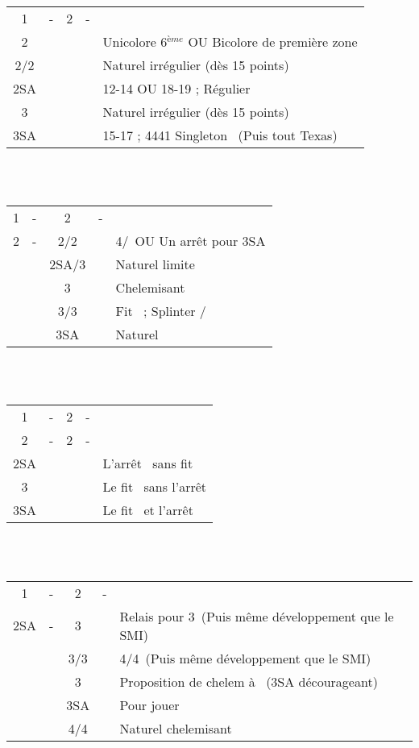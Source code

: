 \documentclass[a4paper, oneside, 11pt]{report}
\begin{document}
\newpage
		\begin{tabular}{cccc|l}
		1\carreau & - & 2\trefle & - &\\
		2\carreau &&&& Unicolore 6$^{ème}$ OU Bicolore de première zone\\
		2\coeur/2\pique &&&& Naturel irrégulier (dès 15 points) \\
		2SA &&&& 12-14 OU 18-19 ; Régulier\\
		3\trefle &&&& Naturel irrégulier (dès 15 points)\\
		3SA &&&& 15-17 ; 4441 Singleton \trefle\ (Puis tout Texas)\\
		\end{tabular}\\\\

		\begin{tabular}{cccc|l}
		1\carreau & - & 2\trefle & - &\\
		2\carreau & - & 2\coeur/2\pique && 4\coeur/\pique\ OU Un arrêt pour 3SA\\
		&& 2SA/3\trefle && Naturel limite\\
		&& 3\carreau && Chelemisant \carreau\\
		&& 3\coeur/3\pique && Fit \carreau\ ; Splinter \coeur/\pique\\
		&& 3SA && Naturel\\
		\end{tabular}\\\\

		\begin{tabular}{cccc|l}
		1\carreau & - & 2\trefle & - &\\
		2\carreau & - & 2\coeur & - &\\
		2SA &&&& L'arrêt \pique\ sans fit \coeur\\
		3\coeur &&&& Le fit \coeur\ sans l'arrêt \pique\\
		3SA&&&& Le fit \coeur\ et l'arrêt \pique\\
		\end{tabular}\\\\

		\begin{tabular}{cccc|l}
		1\carreau & - & 2\trefle & - &\\
		2SA & - & 3\trefle && Relais pour 3\carreau\ (Puis même développement que le SMI)\\
		&& 3\carreau/3\coeur && 4\coeur/4\pique\ (Puis même développement que le SMI)\\
		&& 3\pique && Proposition de chelem à \trefle\ (3SA décourageant)\\
		&& 3SA && Pour jouer\\
		&& 4\trefle/4\carreau && Naturel chelemisant\\
		\end{tabular}\\\\
\end{document}
